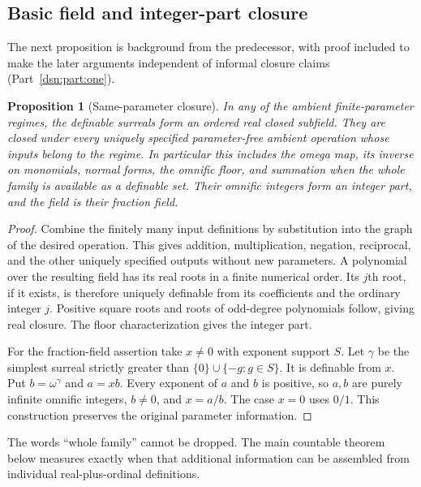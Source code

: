 \documentclass[11pt,a4paper]{article}
\numberwithin{equation}{section}
\newtheorem{proposition}[proposition]{Proposition}
\theoremstyle{definition}
\theoremstyle{remark}
\begin{document}
\subsection{Basic field and integer-part closure}
\label{dsn:rp:subsec:closure-background}

The next proposition is background from the predecessor, with proof
included to make the later arguments independent of informal closure
claims (Part~\ref{dsn:part:one}).

\begin{proposition}[Same-parameter closure]\label{dsn:rp:prop:basic-closure}
In any of the ambient finite-parameter regimes, the definable surreals
form an ordered real closed subfield. They are closed under every
uniquely specified parameter-free ambient operation whose inputs belong
to the regime. In particular this includes the omega map, its inverse
on monomials, normal forms, the omnific floor, and summation when the
\emph{whole family} is available as a definable set. Their omnific
integers form an integer part, and the field is their fraction field.
\end{proposition}

\begin{proof}
Combine the finitely many input definitions by substitution into the
graph of the desired operation. This gives addition, multiplication,
negation, reciprocal, and the other uniquely specified outputs without
new parameters. A polynomial over the resulting field has its real roots
in a finite numerical order. Its $j$th root, if it exists, is therefore
uniquely definable from its coefficients and the ordinary integer $j$.
Positive square roots and roots of odd-degree polynomials follow, giving
real closure. The floor characterization gives the integer part.

For the fraction-field assertion take $x\ne0$ with exponent support $S$.
Let $\gamma$ be the simplest surreal strictly greater than
$\{0\}\cup\{-g:g\in S\}$. It is definable from $x$. Put
$b=\omega^\gamma$ and $a=xb$. Every exponent of $a$ and $b$ is positive,
so $a,b$ are purely infinite omnific integers, $b\ne0$, and $x=a/b$.
The case $x=0$ uses $0/1$. This construction preserves the original
parameter information.
\end{proof}

The words ``whole family'' cannot be dropped. The main countable
theorem below measures exactly when that additional information can be
assembled from individual real-plus-ordinal definitions.
\end{document}
